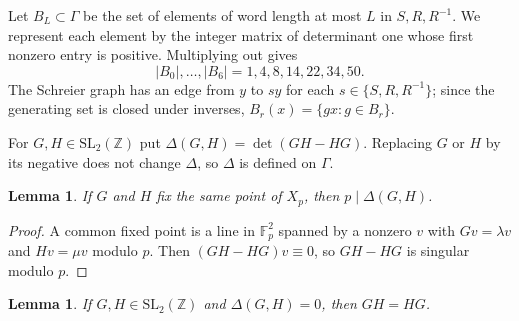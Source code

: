 \documentclass[11pt,a4paper]{article}
\numberwithin{equation}{section}
\newtheorem{lemma}[theorem]{Lemma}
\theoremstyle{remark}
\newcommand{\Z}{\mathbb Z}
\newcommand{\F}{\mathbb F}
\newcommand{\SL}{\mathrm{SL}}
\begin{document}
Let $B_L\subset\Gamma$ be the set of elements of word length at most $L$ in $S,R,R^{-1}$. We represent each element by the integer matrix of determinant one whose first nonzero entry is positive. Multiplying out gives
\[
|B_0|,\ldots,|B_6|=1,4,8,14,22,34,50 .
\]
The Schreier graph has an edge from $y$ to $sy$ for each $s\in\{S,R,R^{-1}\}$; since the generating set is closed under inverses, $B_r(x)=\{gx:g\in B_r\}$.

For $G,H\in\SL_2(\Z)$ put $\Delta(G,H)=\det(GH-HG)$. Replacing $G$ or $H$ by its negative does not change $\Delta$, so $\Delta$ is defined on $\Gamma$.

\begin{lemma}\label{lem:divides}
If $G$ and $H$ fix the same point of $X_p$, then $p\mid\Delta(G,H)$.
\end{lemma}

\begin{proof}
A common fixed point is a line in $\F_p^2$ spanned by a nonzero $v$ with $Gv=\lambda v$ and $Hv=\mu v$ modulo $p$. Then $(GH-HG)v\equiv0$, so $GH-HG$ is singular modulo $p$.
\end{proof}

\begin{lemma}\label{lem:commute}
If $G,H\in\SL_2(\Z)$ and $\Delta(G,H)=0$, then $GH=HG$.
\end{lemma}
\end{document}
